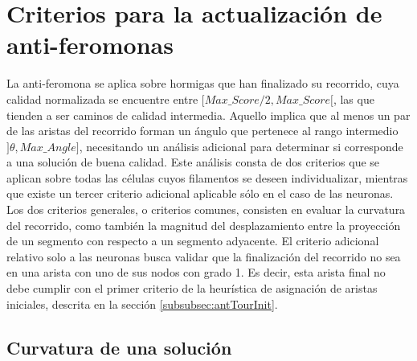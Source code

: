 

\clearpage

\section{Criterios para la actualizaci\'on de anti-feromonas}

La anti-feromona se aplica sobre hormigas que han finalizado su recorrido, cuya calidad normalizada se encuentre entre $[Max\_Score/2, Max\_Score[$, las que tienden a ser caminos de calidad intermedia. Aquello implica que al menos un par de las aristas del recorrido forman un \'angulo que pertenece al rango intermedio $]\theta, Max\_Angle]$, necesitando un an\'alisis adicional para determinar si corresponde a una soluci\'on de buena calidad. Este an\'alisis consta de dos criterios que se aplican sobre todas las c\'elulas cuyos filamentos se deseen individualizar, mientras que existe un tercer criterio adicional aplicable s\'olo en el caso de las neuronas. Los dos criterios generales, o criterios comunes, consisten en evaluar la curvatura del recorrido, como tambi\'en la magnitud del desplazamiento entre la proyecci\'on de un segmento con respecto a un segmento adyacente. El criterio adicional relativo solo a las neuronas busca validar que la finalizaci\'on del recorrido no sea en una arista con uno de sus nodos con grado 1. Es decir, esta arista final no debe cumplir con el primer criterio de la heur\'istica de asignaci\'on de aristas iniciales, descrita en la secci\'on \ref{subsubsec:antTourInit}.

\subsection{Curvatura de una soluci\'on}


